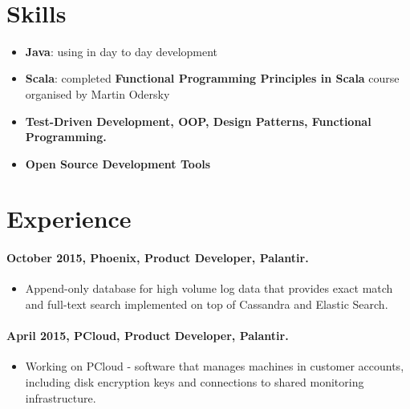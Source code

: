 \documentclass[11pt, a4paper]{article}
\newlength{\wideitemsep}
\let\olditem\item
\renewcommand{\item}{\setlength{\itemsep}{\wideitemsep}\olditem}
\begin{document}
\textsf{\\[0.1in]}


\section*{Skills}
\begin{itemize}
\item \textbf{Java}: using in day to day development
\item \textbf{Scala}: completed \textbf{Functional Programming Principles in Scala} course organised by Martin Odersky 
\item \textbf{Test-Driven Development, OOP, Design Patterns, Functional Programming.}
\item \textbf{Open Source Development Tools}
\end{itemize}

\section*{Experience}

\paragraph{October 2015, Phoenix, Product Developer, Palantir.}
\begin{itemize}
\item Append-only database for high volume log data that provides exact match and full-text search implemented on top of Cassandra and Elastic Search. 
\end{itemize}

\paragraph{April 2015, PCloud, Product Developer, Palantir.}
\begin{itemize}
\item Working on PCloud - software that manages machines in customer accounts, including disk encryption keys and connections to shared monitoring infrastructure. 
\end{itemize}
\end{document}
